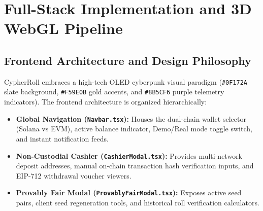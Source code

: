 \section{Full-Stack Implementation and 3D WebGL Pipeline}

\subsection{Frontend Architecture and Design Philosophy}
CypherRoll embraces a high-tech OLED cyberpunk visual paradigm (\texttt{\#0F172A} slate background, \texttt{\#F59E0B} gold accents, and \texttt{\#8B5CF6} purple telemetry indicators). The frontend architecture is organized hierarchically:
\begin{itemize}[leftmargin=1.5em]
    \item \textbf{Global Navigation (\texttt{Navbar.tsx}):} Houses the dual-chain wallet selector (Solana vs EVM), active balance indicator, Demo/Real mode toggle switch, and instant notification feeds.
    \item \textbf{Non-Custodial Cashier (\texttt{CashierModal.tsx}):} Provides multi-network deposit addresses, manual on-chain transaction hash verification inputs, and EIP-712 withdrawal voucher viewers.
    \item \textbf{Provably Fair Modal (\texttt{ProvablyFairModal.tsx}):} Exposes active seed pairs, client seed regeneration tools, and historical roll verification calculators.
\end{itemize}

